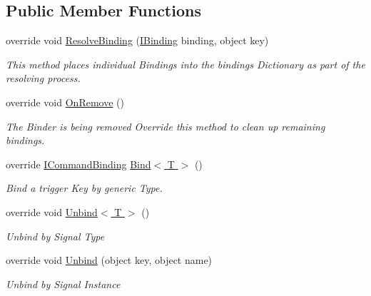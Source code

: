 \subsection*{Public Member Functions}
\begin{DoxyCompactItemize}
\item 
override void \hyperlink{classstrange_1_1extensions_1_1command_1_1impl_1_1_signal_command_binder_a8968e1632b03d1f9223f8e66e721327f}{Resolve\-Binding} (\hyperlink{interfacestrange_1_1framework_1_1api_1_1_i_binding}{I\-Binding} binding, object key)
\begin{DoxyCompactList}\small\item\em This method places individual Bindings into the bindings Dictionary as part of the resolving process. \end{DoxyCompactList}\item 
\hypertarget{classstrange_1_1extensions_1_1command_1_1impl_1_1_signal_command_binder_ab901d2f3ce792135ba5e1ea15c2ea7d6}{override void \hyperlink{classstrange_1_1extensions_1_1command_1_1impl_1_1_signal_command_binder_ab901d2f3ce792135ba5e1ea15c2ea7d6}{On\-Remove} ()}\label{classstrange_1_1extensions_1_1command_1_1impl_1_1_signal_command_binder_ab901d2f3ce792135ba5e1ea15c2ea7d6}

\begin{DoxyCompactList}\small\item\em The Binder is being removed Override this method to clean up remaining bindings. \end{DoxyCompactList}\item 
\hypertarget{classstrange_1_1extensions_1_1command_1_1impl_1_1_signal_command_binder_ac80ab27639b330cbbfaea137328ba032}{override \hyperlink{interfacestrange_1_1extensions_1_1command_1_1api_1_1_i_command_binding}{I\-Command\-Binding} \hyperlink{classstrange_1_1extensions_1_1command_1_1impl_1_1_signal_command_binder_ac80ab27639b330cbbfaea137328ba032}{Bind$<$ T $>$} ()}\label{classstrange_1_1extensions_1_1command_1_1impl_1_1_signal_command_binder_ac80ab27639b330cbbfaea137328ba032}

\begin{DoxyCompactList}\small\item\em Bind a trigger Key by generic Type. \end{DoxyCompactList}\item 
override void \hyperlink{classstrange_1_1extensions_1_1command_1_1impl_1_1_signal_command_binder_a017bc40c1b059569e918cfee6b9b5965}{Unbind$<$ T $>$} ()
\begin{DoxyCompactList}\small\item\em Unbind by Signal Type\end{DoxyCompactList}\item 
override void \hyperlink{classstrange_1_1extensions_1_1command_1_1impl_1_1_signal_command_binder_a4a069725160e63dd054001d3f11ba29c}{Unbind} (object key, object name)
\begin{DoxyCompactList}\small\item\em Unbind by Signal Instance\end{DoxyCompactList}\end{DoxyCompactItemize}

